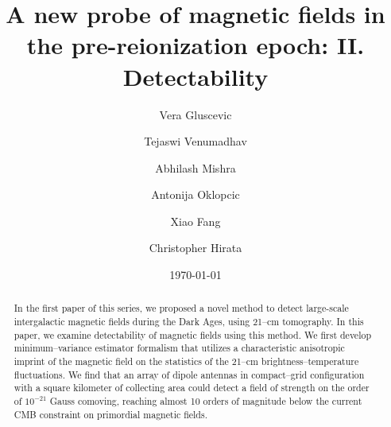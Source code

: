 \documentclass[aps,prd,twocolumn,floatfix,showpacs,superscriptaddress,nofootinbib]{revtex4-1}
\begin{document}
\widetext    
\title{A new probe of magnetic fields in the pre-reionization epoch: II. Detectability}
\author{Vera Gluscevic}
\author{Tejaswi Venumadhav}
\author{Abhilash Mishra} 
\author{Antonija Oklopcic}
\author{Xiao Fang}
\author{Christopher Hirata}
\date{\today}
   

\begin{abstract} 
In the first paper of this series, we proposed a novel method to detect large-scale intergalactic magnetic fields during the Dark Ages, using 21--cm tomography. In this paper, we examine detectability of magnetic fields using this method. We first develop minimum--variance estimator formalism that utilizes a characteristic anisotropic imprint of the magnetic field on the statistics of the 21--cm brightness--temperature fluctuations. We find that an array of dipole antennas in compact--grid configuration with a square kilometer of collecting area could detect a field of strength on the order of $10^{-21}$ Gauss comoving, reaching almost 10 orders of magnitude below the current CMB constraint on primordial magnetic fields. 
\end{abstract} 
    
\pacs{} 
\maketitle

\vspace{-15pt}






  
\appendix 

\label{app:Vrms} 
%



\end{document}
